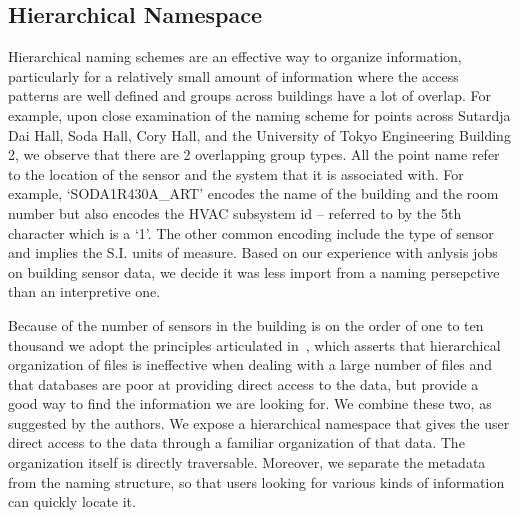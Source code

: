 

\subsection{Hierarchical Namespace}

Hierarchical naming schemes are an effective way to organize information, particularly for a relatively small amount of information
where the access patterns are well defined and groups across buildings have a lot of overlap.  For example, upon close examination of
the naming scheme for points across Sutardja Dai Hall, Soda Hall, Cory Hall, and the University of Tokyo Engineering Building 2, we 
observe that there are 2 overlapping group types.  All the point name refer to the location of the sensor and the system that it is 
associated with.  For example, `SODA1R430A\_ART' encodes the name of the building and the room number but also encodes the HVAC subsystem id --
referred to by the 5th character which is a `1'.  The other common encoding include the type of sensor and implies the S.I. units of measure.
Based on our experience with anlysis jobs on building sensor data, we decide it was less import from a naming persepctive than 
an interpretive one.

Because of the number of sensors in the building is on the order of one to ten thousand we adopt the principles articulated 
in~\cite{hierarchy_is_dead}, which asserts that hierarchical organization of files is ineffective when dealing with a large number of files
and that databases are poor at providing direct access to the data, but provide a good way to find the information we are looking for.
We combine these two, as suggested by the authors.  We expose a hierarchical namespace that gives the user direct access to the data
through a familiar organization of that data.  The organization itself is directly traversable.  Moreover, we separate the metadata from
the naming structure, so that users looking for various kinds of information can quickly locate it.

